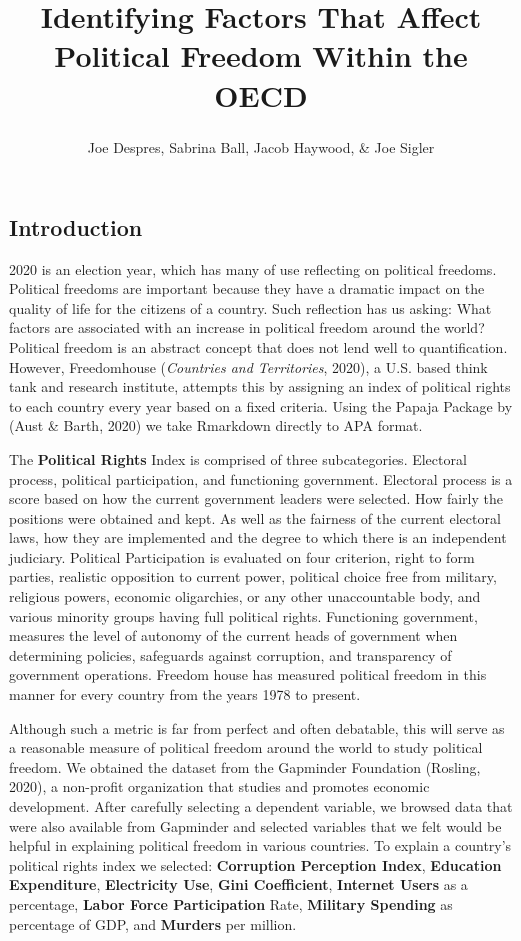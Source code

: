 \documentclass[
  english,
  man,floatsintext]{apa6}
\title{Identifying Factors That Affect Political Freedom Within the OECD}
\author{Joe Despres\textsuperscript{}, Sabrina Ball\textsuperscript{}, Jacob Haywood\textsuperscript{}, \& Joe Sigler\textsuperscript{}}
\date{}
\affiliation{\vspace{0.5cm}\textsuperscript{} Michigan State University\\
November 30, 2020}
\begin{document}
\maketitle

\hypertarget{introduction}{%
\subsection{Introduction}\label{introduction}}

2020 is an election year, which has many of use reflecting on political freedoms. Political freedoms are important because they have a dramatic impact on the quality of life for the citizens of a country. Such reflection has us asking: What factors are associated with an increase in political freedom around the world? Political freedom is an abstract concept that does not lend well to quantification. However, Freedomhouse (\emph{Countries and Territories}, 2020), a U.S. based think tank and research institute, attempts this by assigning an index of political rights to each country every year based on a fixed criteria. Using the Papaja Package by (Aust \& Barth, 2020) we take Rmarkdown directly to APA format.

The \textbf{Political Rights} Index is comprised of three subcategories. Electoral process, political participation, and functioning government. Electoral process is a score based on how the current government leaders were selected. How fairly the positions were obtained and kept. As well as the fairness of the current electoral laws, how they are implemented and the degree to which there is an independent judiciary. Political Participation is evaluated on four criterion, right to form parties, realistic opposition to current power, political choice free from military, religious powers, economic oligarchies, or any other unaccountable body, and various minority groups having full political rights. Functioning government, measures the level of autonomy of the current heads of government when determining policies, safeguards against corruption, and transparency of government operations. Freedom house has measured political freedom in this manner for every country from the years 1978 to present.

Although such a metric is far from perfect and often debatable, this will serve as a reasonable measure of political freedom around the world to study political freedom. We obtained the dataset from the Gapminder Foundation (Rosling, 2020), a non-profit organization that studies and promotes economic development. After carefully selecting a dependent variable, we browsed data that were also available from Gapminder and selected variables that we felt would be helpful in explaining political freedom in various countries. To explain a country's political rights index we selected: \textbf{Corruption Perception Index}, \textbf{Education Expenditure}, \textbf{Electricity Use}, \textbf{Gini Coefficient}, \textbf{Internet Users} as a percentage, \textbf{Labor Force Participation} Rate, \textbf{Military Spending} as percentage of GDP, and \textbf{Murders} per million.
\end{document}
